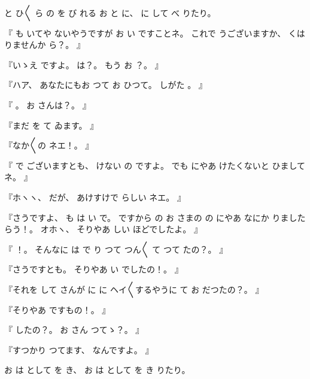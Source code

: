 と
ひ〳〵
ら
の
を
び
れる
お
と
に、
%
に
して
べ
りたり。

『
も
いてや
ないやうですが
お
い
ですことネ。
%
これで
うございますか、
%
くは
りませんか
ら？。
』

『いゝえ
ですよ。
%
は？。
%
もう
お
？。
』

『ハア、
%
あなたにもお
つて
お
ひつて。
%
しがた
。
』

『
。
%
お
さんは？。
』

『まだ
を
て
ゐます。
』

『なか〳〵の
ネエ！。
』

『
で
ございますとも、
%
けない
の
ですよ。
%
でも
にやあ
けたくないと
ひましてネ。
』

『ホヽヽ、
%
だが、
%
あけすけで
らしい
ネエ。
』

『さうですよ、
%
も
は
い
で。
%
ですから
の
お
さまの
の
にやあ
なにか
りましたらう！。
%
オホヽ、
%
そりやあ
しい
ほどでしたよ。
』

『
！。
%
そんなに
は
で
り
つて
つん〳〵
て
つて
たの？。
』

『さうですとも。
%
そりやあ
い
でしたの！。
』

『それを
して
さんが
に
に
ヘイ〳〵するやうに
て
お
だつたの？。
』

『そりやあ
ですもの！。
』

『
したの？。
%
お
さん
つてゝ？。
』

『すつかり
つてます、
%
なんですよ。
』

お
は
として
を
き、
%
お
は
として
を
き
りたり。
